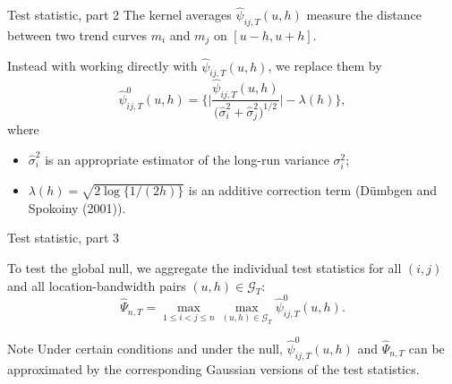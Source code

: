\documentclass[10pt, handout]{beamer}
\begin{document}
\begin{frame}[label = frame_teststatistic]{Test statistic, part 2}
The kernel averages $\widehat{\psi}_{ij, T}(u,h)$ measure the distance between two trend curves $m_i$ and $m_j$ on $[u - h, u + h]$. \pause

Instead with working directly with $\widehat{\psi}_{ij, T}(u,h)$, we replace them by
\begin{equation*}
\widehat{\psi}^0_{ij, T}(u,h) = \bigg\{ \bigg|\frac{\widehat{\psi}_{ij, T}(u,h)}{\big(\widehat{\sigma}_i^2 + \widehat{\sigma}_j^2\big)^{1/2}}\bigg| - \lambda(h) \bigg\}, 
\end{equation*}\pause
\vspace{-3mm}
where 
\begin{itemize}
\item $\widehat{\sigma}_i^2$ is an appropriate estimator of the long-run variance $\sigma^2_i$;
\item $\lambda(h) = \sqrt{2 \log \{ 1/(2h) \}}$ is an additive correction term (D{\"u}mbgen and Spokoiny (2001)). %
\end{itemize}
\end{frame}

\begin{frame}{Test statistic, part 3}

To test the global null, we aggregate the individual test statistics \linebreak for all $(i, j)$ and all location-bandwidth pairs $(u, h) \in \mathcal{G}_T$:
\begin{equation*}
\widehat{\Psi}_{n, T} = \max_{1 \leq i < j \leq n} \max_{(u,h) \in \mathcal{G}_T} \widehat{\psi}^0_{ij, T}(u,h). 
\end{equation*}\pause
\vspace{-3mm}
\begin{block}{Note}
Under certain conditions and under the null, $\widehat{\psi}^0_{ij, T}(u,h)$ and $\widehat{\Psi}_{n, T}$ can be approximated by the corresponding Gaussian versions of the test statistics.
\end{block}
\end{frame}
\end{document}
